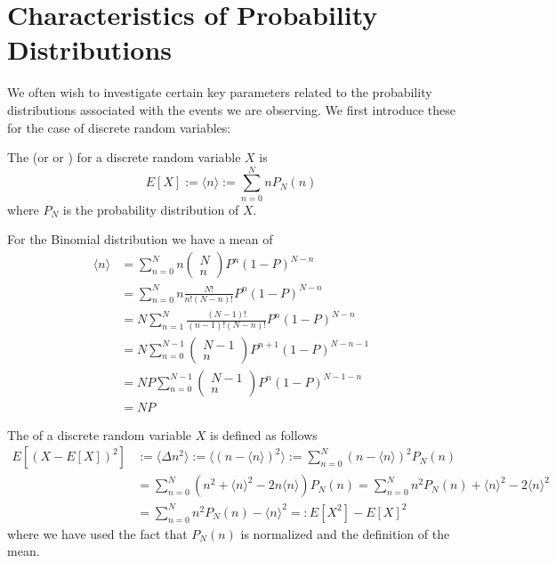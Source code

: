 \documentclass[12pt, a4paper, oneside, openright, titlepage]{book}
\begin{document}
\section{Characteristics of Probability Distributions}

We often wish to investigate certain key parameters related to the probability distributions associated with the events we are observing. We first introduce these for the case of discrete random variables:

\begin{defn}
    The  (or  or ) for a discrete random variable $X$ is \begin{equation*}
        E[X] := \langle n \rangle := \sum_{n=0}^NnP_N(n)
    \end{equation*}
    where $P_N$ is the probability distribution of $X$.
\end{defn}
For the Binomial distribution we have a mean of \begin{align*}
    \langle n \rangle &= \sum_{n=0}^Nn\begin{pmatrix} N \\ n\end{pmatrix} P^n(1-P)^{N-n} \\
    &= \sum_{n=0}^Nn\frac{N!}{n!(N-n)!}P^n(1-P)^{N-n} \\
    &= N\sum_{n=1}^N\frac{(N-1)!}{(n-1)!(N-n)!}P^n(1-P)^{N-n} \\
    &= N\sum_{n=0}^{N-1}\begin{pmatrix} N-1 \\ n\end{pmatrix} P^{n+1}(1-P)^{N-n-1} \\
    &= NP\sum_{n=0}^{N-1}\begin{pmatrix} N-1 \\ n\end{pmatrix} P^{n}(1-P)^{N-1-n} \\
    &= NP
\end{align*}


\begin{defn}
    The  of a discrete random variable $X$ is defined as follows \begin{align*}
        E[(X-E[X])^2] &:= \langle \Delta n^2\rangle := \langle (n-\langle n\rangle)^2\rangle := \sum_{n=0}^N(n-\langle n \rangle)^2P_N(n) \\
        &= \sum_{n=0}^N(n^2+\langle n \rangle^2-2n\langle n \rangle)P_N(n) = \sum_{n=0}^Nn^2P_N(n) + \langle n\rangle^2 - 2\langle n\rangle^2 \\
        &= \sum_{n=0}^Nn^2P_N(n) - \langle n\rangle^2 =: E[X^2] - E[X]^2
    \end{align*}
    where we have used the fact that $P_N(n)$ is normalized and the definition of the mean.
\end{defn}
\end{document}
